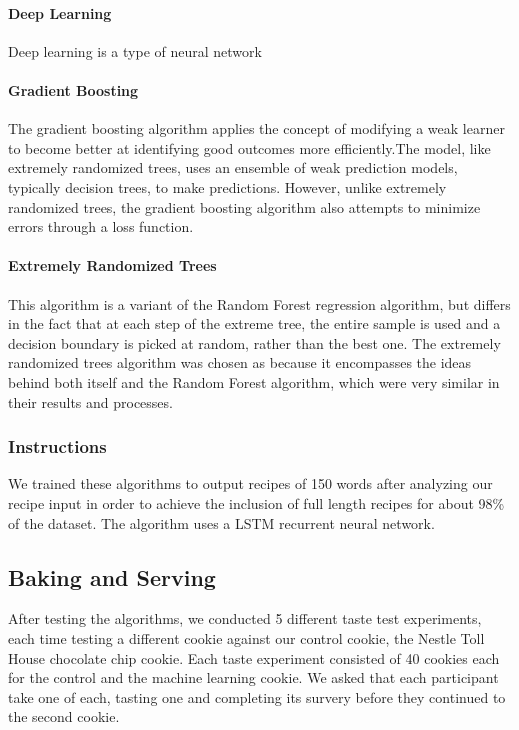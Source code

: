 \documentclass[11pt, a4paper]{article}
\begin{document}
		\paragraph{Deep Learning}
		Deep learning is a type of neural network
		\paragraph{Gradient Boosting}
		The gradient boosting algorithm applies the concept of modifying a weak learner to become better at identifying good outcomes more efficiently.The model, like extremely randomized trees, uses an ensemble of weak prediction models, typically decision trees, to make predictions. However, unlike extremely randomized trees, the gradient boosting algorithm also attempts to minimize errors through a loss function.
		\paragraph{Extremely Randomized Trees}
		This algorithm is a variant of the Random Forest regression algorithm, but differs in the fact that at each step of the extreme tree, the entire sample is used and a decision boundary is picked at random, rather than the best one.
		The extremely randomized trees algorithm was chosen as because it encompasses the ideas behind both itself and the Random Forest algorithm, which were very similar in their results and processes.
		\subsubsection{Instructions}
		We trained these algorithms to output recipes of 150 words after analyzing our recipe input in order to achieve the inclusion of full length recipes for about 98\% of the dataset. The algorithm uses a LSTM recurrent neural network. 
		\subsection{Baking and Serving}
		After testing the algorithms, we conducted 5 different taste test experiments, each time testing a different cookie against our control cookie, the Nestle\textsuperscript{\textregistered} Toll House\textsuperscript{\textregistered} chocolate chip cookie. Each taste experiment consisted of 40 cookies each for the control and the machine learning cookie. We asked that each participant take one of each, tasting one and completing its survery before they continued to the second cookie.
\end{document}
